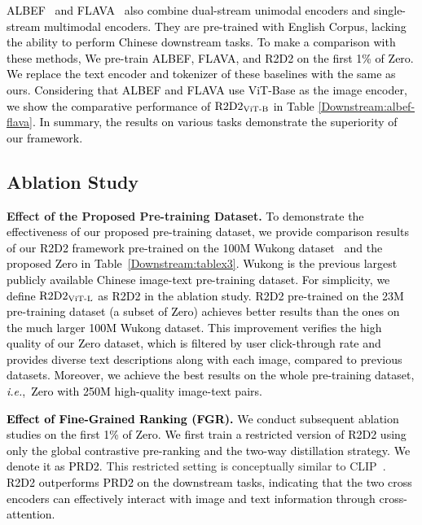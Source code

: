 \documentclass[sigconf]{acmart}
\def\ie{\mbox{\textit{i.e.}, }}
\def\xie{\textcolor{black}}
\def\blue{\textcolor{black}}
\def\mmxie{\textcolor{black}}
\def\mmljc{\textcolor{black}}
\def\mmcr{\textcolor{black}}
\def\pretraindata{Zero}
\begin{document}
\mmxie{ALBEF~\cite{ALBEF} and FLAVA~\cite{FLAVA} also combine dual-stream unimodal encoders and single-stream multimodal encoders. They are pre-trained with English Corpus, lacking the ability to perform Chinese downstream tasks. To make a comparison with these methods, We pre-train ALBEF, FLAVA, and \mmcr{R2D2} on the first 1\% of \mmcr{Zero}. We replace the text encoder and tokenizer of these baselines with the same as ours. Considering that ALBEF and FLAVA use ViT-Base as the image encoder, we show the comparative performance of $\text{\mmcr{R2D2}}_\text{ViT-B}$ in Table \ref{Downstream:albef-flava}. In summary, the results on various tasks \mmljc{demonstrate the superiority} of our framework.
}























\subsection{Ablation Study
}\label{sec:ablation}
\textbf{Effect of the Proposed Pre-training Dataset.} 
\mmxie{To demonstrate the effectiveness of our proposed pre-training dataset, we provide comparison results of our \mmcr{R2D2} framework pre-trained on the 100M Wukong dataset~\cite{gu2022wukong} and the proposed \mmcr{Zero} in Table~\ref{Downstream:tablex3}. \mmxie{Wukong is the \mmljc{previous} largest publicly available Chinese image-text pre-training dataset.} For simplicity, we define $\text{\mmcr{R2D2}}_\text{ViT-L}$ as \mmcr{R2D2} in the ablation study.}
\mmxie{\mmcr{R2D2} pre-trained on the 23M pre-training dataset (a subset of \mmcr{Zero}) achieves better results than the ones on the much larger 100M Wukong dataset. 
This improvement verifies the high quality of our \mmcr{Zero} dataset, which is filtered by user click-through rate and provides diverse text descriptions along with each image, compared to previous datasets.} 
\blue{Moreover, we achieve the best results on the whole pre-training dataset, \ie \mmcr{Zero} with 250M high-quality image-text pairs.
}

\mmxie{\textbf{Effect of Fine-Grained Ranking (\mmcr{FGR}).}}
\xie{We conduct subsequent ablation studies on the first \blue{1\%} of \pretraindata{}.}
\mmxie{We first train a restricted version of \mmcr{R2D2} using only the \mmcr{global contrastive pre-ranking} and the two-way distillation strategy.
We denote it as \mmcr{PRD2}.} This restricted setting is conceptually similar to CLIP~\cite{CLIP}.
\mmxie{\mmcr{R2D2} outperforms \mmcr{PRD2} on the downstream tasks, indicating that the two cross encoders can effectively interact with image and text information through cross-attention.
}
\end{document}

